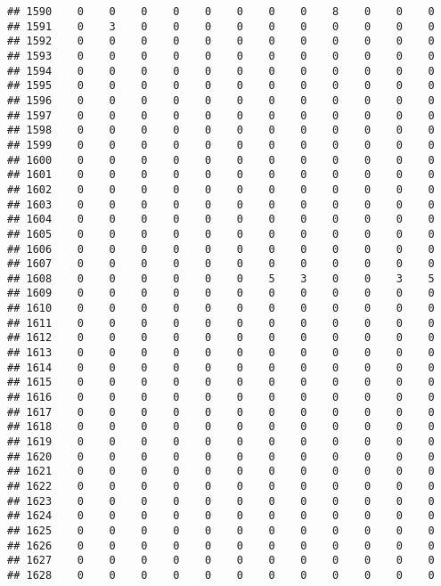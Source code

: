 \documentclass[]{article}
\begin{document}
\begin{verbatim}
## 1590    0    0    0    0    0    0    0    0    8    0    0    0
## 1591    0    3    0    0    0    0    0    0    0    0    0    0
## 1592    0    0    0    0    0    0    0    0    0    0    0    0
## 1593    0    0    0    0    0    0    0    0    0    0    0    0
## 1594    0    0    0    0    0    0    0    0    0    0    0    0
## 1595    0    0    0    0    0    0    0    0    0    0    0    0
## 1596    0    0    0    0    0    0    0    0    0    0    0    0
## 1597    0    0    0    0    0    0    0    0    0    0    0    0
## 1598    0    0    0    0    0    0    0    0    0    0    0    0
## 1599    0    0    0    0    0    0    0    0    0    0    0    0
## 1600    0    0    0    0    0    0    0    0    0    0    0    0
## 1601    0    0    0    0    0    0    0    0    0    0    0    0
## 1602    0    0    0    0    0    0    0    0    0    0    0    0
## 1603    0    0    0    0    0    0    0    0    0    0    0    0
## 1604    0    0    0    0    0    0    0    0    0    0    0    0
## 1605    0    0    0    0    0    0    0    0    0    0    0    0
## 1606    0    0    0    0    0    0    0    0    0    0    0    0
## 1607    0    0    0    0    0    0    0    0    0    0    0    0
## 1608    0    0    0    0    0    0    5    3    0    0    3    5
## 1609    0    0    0    0    0    0    0    0    0    0    0    0
## 1610    0    0    0    0    0    0    0    0    0    0    0    0
## 1611    0    0    0    0    0    0    0    0    0    0    0    0
## 1612    0    0    0    0    0    0    0    0    0    0    0    0
## 1613    0    0    0    0    0    0    0    0    0    0    0    0
## 1614    0    0    0    0    0    0    0    0    0    0    0    0
## 1615    0    0    0    0    0    0    0    0    0    0    0    0
## 1616    0    0    0    0    0    0    0    0    0    0    0    0
## 1617    0    0    0    0    0    0    0    0    0    0    0    0
## 1618    0    0    0    0    0    0    0    0    0    0    0    0
## 1619    0    0    0    0    0    0    0    0    0    0    0    0
## 1620    0    0    0    0    0    0    0    0    0    0    0    0
## 1621    0    0    0    0    0    0    0    0    0    0    0    0
## 1622    0    0    0    0    0    0    0    0    0    0    0    0
## 1623    0    0    0    0    0    0    0    0    0    0    0    0
## 1624    0    0    0    0    0    0    0    0    0    0    0    0
## 1625    0    0    0    0    0    0    0    0    0    0    0    0
## 1626    0    0    0    0    0    0    0    0    0    0    0    0
## 1627    0    0    0    0    0    0    0    0    0    0    0    0
## 1628    0    0    0    0    0    0    0    0    0    0    0    0

\end{verbatim}
\end{document}
